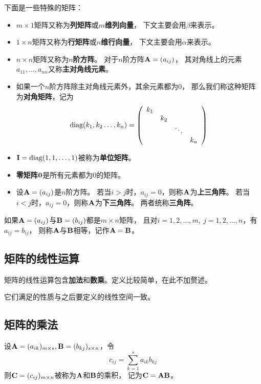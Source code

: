 下面是一些特殊的矩阵：
\begin{itemize}
  \item
  $m\times 1$矩阵又称为\textbf{列矩阵}或$m$\textbf{维列向量}，
  下文主要会用$\beta$来表示。
  \item
  $1\times n$矩阵又称为\textbf{行矩阵}或$n$\textbf{维行向量}，
  下文主要会用$\alpha$来表示。
  \item
  $n\times n$矩阵又称为$n$\textbf{阶方阵}。
  对于$n$阶方阵$\mmA=(a_{ij})$，
  其对角线上的元素$a_{11},\dots,a_{nn}$又称\textbf{主对角线元素}。
  \item
  如果一个$n$阶方阵除主对角线元素外，其余元素都为0，
  那么我们称这种矩阵为\textbf{对角矩阵}，记为
  \[
    \mdiag(k_1, k_2\dots,k_n)= \mmat{cccc}{
      k_1 &     &        & \\
          & k_2 &        & \\
          &     & \ddots & \\
          &     &        & k_n }
  \]
  \item
  $\mmI = \mdiag(1,1,\dots,1)$被称为\textbf{单位矩阵}。
  \item
  \textbf{零矩阵}$\mmZero$是所有元素都为0的矩阵。
  \item
  设$\mmA=(a_{ij})$是$n$阶方阵。
  若当$i>j$时，$a_{ij}=0$，则称$\mmA$为\textbf{上三角阵}。
  若当$i<j$时，$a_{ij}=0$，则称$\mmA$为\textbf{下三角阵}。
  两者统称\textbf{三角阵}。
\end{itemize}

\begin{definition}[矩阵相等]
    如果$\mmA=(a_{ij})$与$\mmB=(b_{ij})$都是$m\times n$矩阵，
    且对$i=1,2,\dots,m,\ j=1,2,\dots,n$，有$a_{ij}=b_{ij}$，
    则称$\mmA$与$\mmB$相等，记作$\mmA=\mmB$。
\end{definition}

\subsection{矩阵的线性运算}
矩阵的线性运算包含\textbf{加法}和\textbf{数乘}。定义比较简单，在此不加赘述。

它们满足的性质与之后要定义的线性空间一致。

\subsection{矩阵的乘法}
\begin{definition}[矩阵的乘法]
  设$\mmA=(a_{ik})_{m\times s}, \mmB=(b_{kj})_{s\times n}$，令
  \begin{equation}
  c_{ij}=\sum_{k=1}^{s}a_{ik}b_{kj}
  \end{equation}
  则$\mmC=(c_{ij})_{m\times n}$被称为$\mmA$和$\mmB$的乘积，
  记为$\mmC = \mmA\mmB$。
\end{definition}

